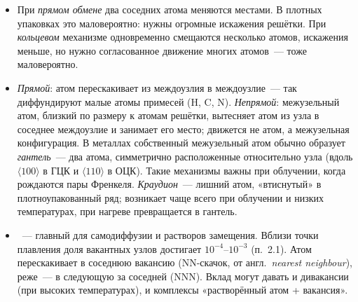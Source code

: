 \begin{itemize}
\item {} При \emph{прямом обмене} два соседних
атома меняются местами. В плотных упаковках это маловероятно: нужны
огромные искажения решётки. При \emph{кольцевом} механизме
одновременно смещаются несколько атомов, искажения меньше, но нужно
согласованное движение многих атомов~— тоже маловероятно.
\item {} \emph{Прямой}: атом перескакивает
из междоузлия в междоузлие~— так диффундируют малые атомы примесей (H, C,
N). \emph{Непрямой}: межузельный атом, близкий по размеру к атомам
решётки, вытесняет атом из узла в соседнее междоузлие и занимает его
место; движется не атом, а межузельная конфигурация. В металлах
собственный межузельный атом обычно образует \emph{гантель}~— два
атома, симметрично расположенные относительно узла (вдоль
$\langle100\rangle$ в ГЦК и $\langle110\rangle$ в ОЦК). Такие механизмы
важны при облучении, когда рождаются пары Френкеля.
\emph{Краудион}~— лишний атом, «втиснутый» в плотноупакованный ряд;
возникает чаще всего при облучении и низких температурах, при нагреве
превращается в гантель.
\item {}~— главный для самодиффузии и
растворов замещения. Вблизи точки плавления доля вакантных узлов
достигает $10^{-4}$--$10^{-3}$ (п.~2.1). Атом перескакивает в соседнюю
вакансию (NN-скачок, от англ.\ \emph{nearest neighbour}), реже~— в
следующую за соседней (NNN). Вклад могут давать и дивакансии (при
высоких температурах), и комплексы «растворённый атом + вакансия».
\end{itemize}

